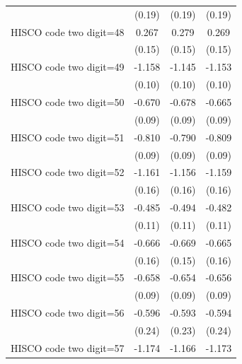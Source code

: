 {\begin{tabular}{l*{3}{c}}
                    &      (0.19)         &      (0.19)         &      (0.19)         \\
HISCO code two digit=48&       0.267\sym{*}  &       0.279\sym{*}  &       0.269\sym{*}  \\
                    &      (0.15)         &      (0.15)         &      (0.15)         \\
HISCO code two digit=49&      -1.158\sym{***}&      -1.145\sym{***}&      -1.153\sym{***}\\
                    &      (0.10)         &      (0.10)         &      (0.10)         \\
HISCO code two digit=50&      -0.670\sym{***}&      -0.678\sym{***}&      -0.665\sym{***}\\
                    &      (0.09)         &      (0.09)         &      (0.09)         \\
HISCO code two digit=51&      -0.810\sym{***}&      -0.790\sym{***}&      -0.809\sym{***}\\
                    &      (0.09)         &      (0.09)         &      (0.09)         \\
HISCO code two digit=52&      -1.161\sym{***}&      -1.156\sym{***}&      -1.159\sym{***}\\
                    &      (0.16)         &      (0.16)         &      (0.16)         \\
HISCO code two digit=53&      -0.485\sym{***}&      -0.494\sym{***}&      -0.482\sym{***}\\
                    &      (0.11)         &      (0.11)         &      (0.11)         \\
HISCO code two digit=54&      -0.666\sym{***}&      -0.669\sym{***}&      -0.665\sym{***}\\
                    &      (0.16)         &      (0.15)         &      (0.16)         \\
HISCO code two digit=55&      -0.658\sym{***}&      -0.654\sym{***}&      -0.656\sym{***}\\
                    &      (0.09)         &      (0.09)         &      (0.09)         \\
HISCO code two digit=56&      -0.596\sym{**} &      -0.593\sym{***}&      -0.594\sym{**} \\
                    &      (0.24)         &      (0.23)         &      (0.24)         \\
HISCO code two digit=57&      -1.174\sym{***}&      -1.166\sym{***}&      -1.173\sym{***}\\

\end{tabular}}
